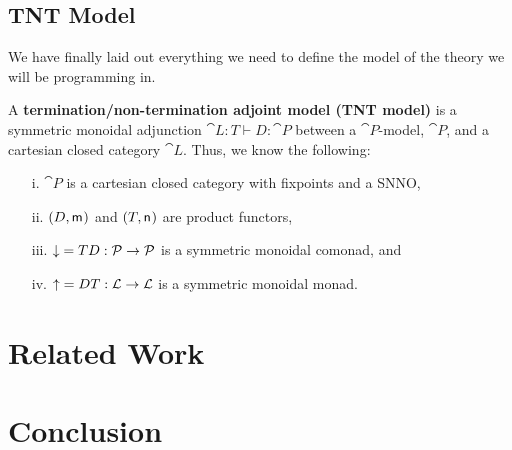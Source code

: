 \subsection{TNT Model}
\label{subsec:tnt_model}
We have finally laid out everything we need to define the model of the
theory we will be programming in.
\begin{definition}
  \label{def:TNT-model}
  A \textbf{termination/non-termination adjoint model (TNT model)} is
  a symmetric monoidal adjunction $\cat{L} : T \vdash D : \cat{P}$
  between a $\cat{P}$-model, $\cat{P}$, and a cartesian closed
  category $\cat{L}$.  Thus, we know the following:
  \begin{itemize}
  \item[i.] $\cat{P}$ is a cartesian closed category with fixpoints and a SNNO,
  \item[ii.] $(D,\mathsf{m}_{})$ and $(T, \mathsf{n}_{})$ are product functors,
  \item[iii.] $\mathop{\downarrow} = TD : \mathcal{P} \rightarrow \mathcal{P}$ is a symmetric monoidal
    comonad, and
  \item[iv.] $\mathop{\uparrow} = DT : \mathcal{L} \rightarrow \mathcal{L}$ is a symmetric monoidal
    monad.
  \end{itemize}
\end{definition}




\section{Related Work}
\label{sec:related_work}

\section{Conclusion}
\label{sec:conclusion}




\nocite{*}
\appendix



